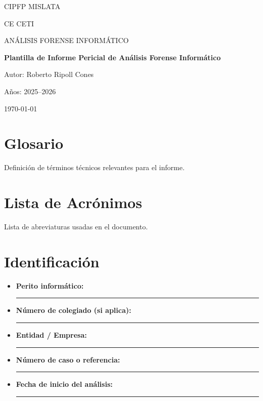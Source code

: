 \documentclass[12pt,a4paper]{article}
\title{\DocTitle}
\author{\DocAuthor}
\date{\DocDate}
\newcommand{\DocTitle}{Plantilla de Informe Pericial de Análisis Forense Informático}
\newcommand{\DocAuthor}{Roberto Ripoll Cones}
\newcommand{\DocCenter}{CIPFP MISLATA}
\newcommand{\DocCourse}{CE CETI}
\newcommand{\DocSubject}{ANÁLISIS FORENSE INFORMÁTICO}
\newcommand{\DocYear}{2025--2026}
\newcommand{\DocDate}{\today}
\begin{document}
\sloppy

\begin{titlepage}
\centering
{\scshape\LARGE \DocCenter \par}
\vspace{0.5cm}
{\scshape\Large \DocCourse \par}
{\scshape\large \DocSubject \par}
\vspace{2cm}
{\Huge\bfseries \DocTitle \par}
\vspace{2cm}
{\large Autor: \DocAuthor \par}
{\large Años: \DocYear \par}
\vfill
{\large \DocDate \par}
\end{titlepage}

\tableofcontents
\newpage

\listoffigures
\newpage

\listoftables
\newpage


\section*{Glosario}
Definición de términos técnicos relevantes para el informe.
\newpage

\section*{Lista de Acrónimos}
Lista de abreviaturas usadas en el documento.
\newpage

\section{Identificación}
\begin{itemize}
    \item \textbf{Perito informático:} \rule{10cm}{0.2pt}
    \item \textbf{Número de colegiado (si aplica):} \rule{7cm}{0.2pt}
    \item \textbf{Entidad / Empresa:} \rule{10cm}{0.2pt}
    \item \textbf{Número de caso o referencia:} \rule{7cm}{0.2pt}
    \item \textbf{Fecha de inicio del análisis:} \rule{6cm}{0.2pt}
\end{itemize}
\end{document}
